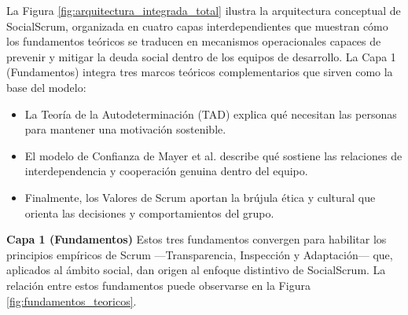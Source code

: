 La Figura \ref{fig:arquitectura_integrada_total} ilustra la arquitectura conceptual de SocialScrum, organizada en cuatro capas interdependientes que muestran cómo los fundamentos teóricos se traducen en mecanismos operacionales capaces de prevenir y mitigar la deuda social dentro de los equipos de desarrollo.
La Capa 1 (Fundamentos) integra tres marcos teóricos complementarios que sirven como la base del modelo:

\begin{itemize}
    \item La Teoría de la Autodeterminación (TAD) explica qué necesitan las personas para mantener una motivación sostenible.
    \item El modelo de Confianza de Mayer et al. describe qué sostiene las relaciones de interdependencia y cooperación genuina dentro del equipo.
    \item Finalmente, los Valores de Scrum aportan la brújula ética y cultural que orienta las decisiones y comportamientos del grupo.
\end{itemize}

\textbf{Capa 1 (Fundamentos)} Estos tres fundamentos convergen para habilitar los principios empíricos de Scrum —Transparencia, Inspección y Adaptación— que, aplicados al ámbito social, dan origen al enfoque distintivo de SocialScrum.
La relación entre estos fundamentos puede observarse en la Figura \ref{fig:fundamentos_teoricos}.

